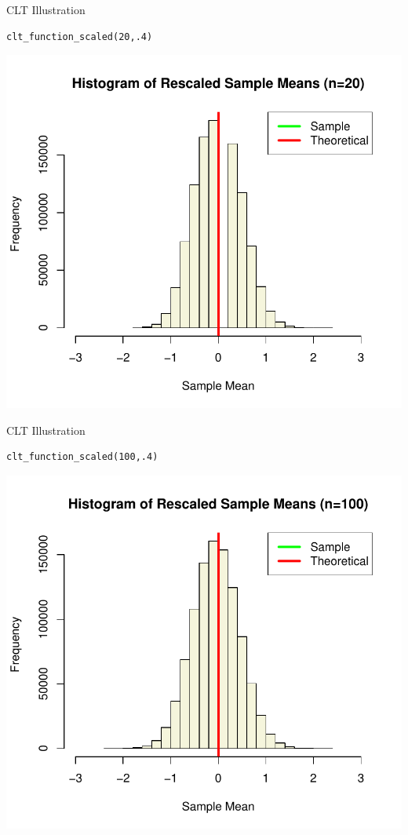 \begin{frame}[fragile]{CLT Illustration}
\begin{lstlisting}
clt_function_scaled(20,.4)
\end{lstlisting}
\begin{center}
\includegraphics[height=.8\textheight]{clts20}
\end{center}
\end{frame}



\begin{frame}[fragile]{CLT Illustration}
\begin{lstlisting}
clt_function_scaled(100,.4)
\end{lstlisting}
\begin{center}
\includegraphics[height=.8\textheight]{clts100}
\end{center}
\end{frame}



